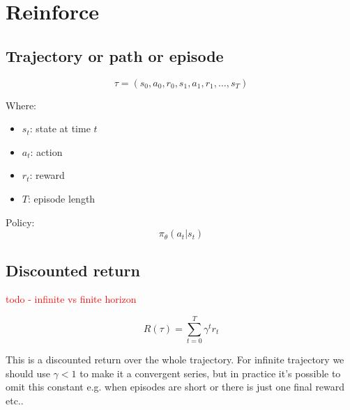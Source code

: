 \documentclass[preprint,12pt]{elsarticle}
\begin{document}


\maketitle

\section*{Reinforce}

\subsection*{Trajectory or path or episode}

\begin{equation}
\label{eq:trajectory}
\tau = (s_0, a_0, r_0, s_1, a_1, r_1, \dots, s_T)
\end{equation}

Where:
\begin{itemize}
	\item $s_t$: state at time $t$
	\item $a_t$: action
	\item $r_t$: reward
	\item $T$: episode length
\end{itemize}

Policy:
\begin{equation}
\label{eq:policy}
\pi_\theta(a_t | s_t)
\end{equation}

\subsection*{Discounted return}

\textcolor{red}{todo - infinite vs finite horizon}

\begin{equation}
\label{eq:discounted-return}
R(\tau) = \sum_{t=0}^T \gamma^t r_t
\end{equation}

This is a discounted return over the whole trajectory. For infinite trajectory we should use $\gamma < 1$ to make it a convergent series, but in practice it’s possible to omit this constant e.g. when episodes are short or there is just one final reward etc..
\end{document}
